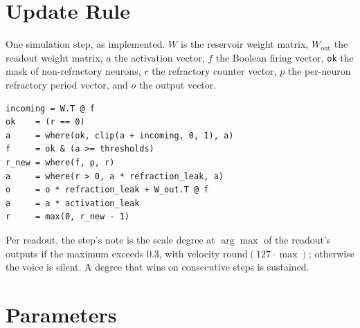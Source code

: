 \documentclass[conference]{IEEEtran}
\begin{document}
\clearpage
\appendices

\section{Update Rule}
\label{app:update}

One simulation step, as implemented. $W$ is the reservoir weight matrix, $W_{\text{out}}$ the readout weight matrix, $a$ the activation vector, $f$ the Boolean firing vector, \texttt{ok} the mask of non-refractory neurons, $r$ the refractory counter vector, $p$ the per-neuron refractory period vector, and $o$ the output vector.

{\footnotesize
\begin{verbatim}
incoming = W.T @ f
ok    = (r == 0)
a     = where(ok, clip(a + incoming, 0, 1), a)
f     = ok & (a >= thresholds)
r_new = where(f, p, r)
a     = where(r > 0, a * refraction_leak, a)
o     = o * refraction_leak + W_out.T @ f
a     = a * activation_leak
r     = max(0, r_new - 1)
\end{verbatim}
}

Per readout, the step's note is the scale degree at $\arg\max$ of the readout's outputs if the maximum exceeds 0.3, with velocity $\mathrm{round}(127 \cdot \max)$; otherwise the voice is silent. A degree that wins on consecutive steps is sustained.

\section{Parameters}
\label{app:params}
\end{document}
